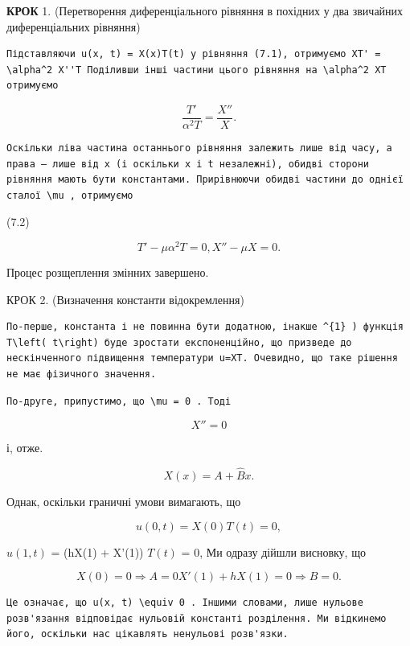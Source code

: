 \documentclass[
  ukrainian,
]{article}
\begin{document}
\textbf{КРОК} 1. (Перетворення диференціального рівняння в похідних у
два звичайних диференціальних рівняння)

\begin{verbatim}
Підставляючи u(x, t) = X(x)T(t) у рівняння (7.1), отримуємо XT' = \alpha^2 X''T Поділивши інші частини цього рівняння на \alpha^2 XT отримуємо
\end{verbatim}

\[
\frac{T'}{\alpha^2 T} = \frac{X''}{X} .
\]

\begin{verbatim}
Оскільки ліва частина останнього рівняння залежить лише від часу, а права — лише від x (і оскільки x і t незалежні), обидві сторони рівняння мають бути константами. Прирівнюючи обидві частини до однієї сталої \mu , отримуємо
\end{verbatim}

(7.2)

\[
T' - \mu \alpha^{2} T = 0, X'' - \mu X = 0.
\]

Процес розщеплення змінних завершено.

КРОК 2. (Визначення константи відокремлення)

\begin{verbatim}
По-перше, константа і не повинна бути додатною, інакше ^{1} ) функція T\left( t\right) буде зростати експоненційно, що призведе до нескінченного підвищення температури u=XT. Очевидно, що таке рішення не має фізичного значення.
\end{verbatim}

\begin{verbatim}
По-друге, припустимо, що \mu = 0 . Тоді
\end{verbatim}

\[
X'' = 0
\]

і, отже.

\[
X(x) = A + \hat{B}x.
\]

Однак, оскільки граничні умови вимагають, що

\[
u(0, t) = X(0) T(t) = 0,
\]

\(u(1, t)\) = (hX(1) + X'(1)) \(T(t)\) = 0, Ми одразу дійшли висновку,
що

\[
X(0) = 0
\Rightarrow A = 0 X'(1) + hX(1) = 0 \Rightarrow B = 0 .
\]

\begin{verbatim}
Це означає, що u(x, t) \equiv 0 . Іншими словами, лише нульове розв'язання відповідає нульовій константі розділення. Ми відкинемо його, оскільки нас цікавлять ненульові розв'язки.
\end{verbatim}
\end{document}
